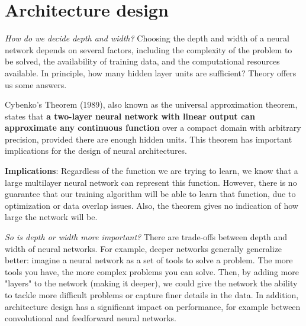 \section{Architecture design}
\textit{How do we decide depth and width?} Choosing the depth and width of a neural network depends on several factors, including the complexity of the problem to be solved, the availability of training data, and the computational resources available. In principle, how many hidden layer units are sufficient? Theory offers us some answers.

\begin{remark}
Cybenko's Theorem (1989), also known as the universal approximation theorem, states that \textbf{a two-layer neural network with linear output can approximate any continuous function} over a compact domain with arbitrary precision, provided there are enough hidden units. This theorem has important implications for the design of neural architectures.
\end{remark}

\textbf{Implications}: Regardless of the function we are trying to learn, we know that a large multilayer neural network can represent this function. However, there is no guarantee that our training algorithm will be able to learn that function, due to optimization or data overlap issues. Also, the theorem gives no indication of how large the network will be.

\textit{So is depth or width more important?} There are trade-offs between depth and width of neural networks. For example, deeper networks generally generalize better: imagine a neural network as a set of tools to solve a problem. The more tools you have, the more complex problems you can solve. Then, by adding more "layers" to the network (making it deeper), we could give the network the ability to tackle more difficult problems or capture finer details in the data. In addition, architecture design has a significant impact on performance, for example between convolutional and feedforward neural networks.